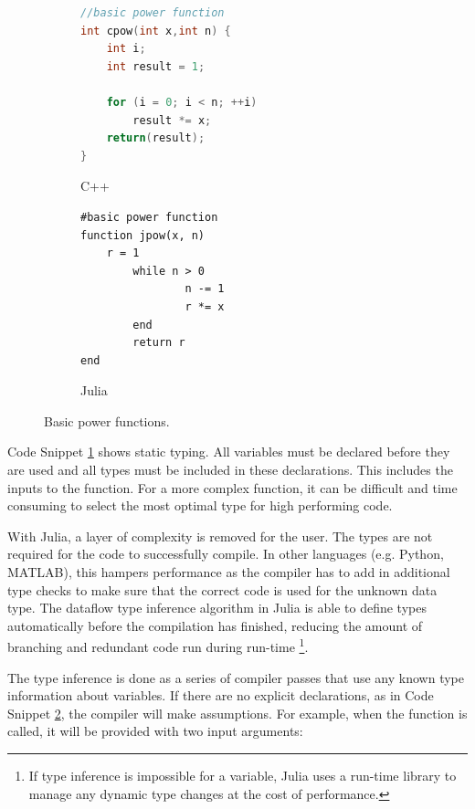 
\begin{figure}[htb!]
    \begin{subfigure}{0.48\textwidth}
\begin{lstlisting}[language=C]
//basic power function
int cpow(int x,int n) {
    int i;
    int result = 1;

    for (i = 0; i < n; ++i)
        result *= x;
    return(result);
}
\end{lstlisting}
    \caption{C++}
    \label{code:cpow}
    \end{subfigure}%
    \hfill
    \begin{subfigure}{0.48\textwidth}
\begin{lstlisting}
#basic power function
function jpow(x, n) 
    r = 1
        while n > 0
                n -= 1
                r *= x
        end
        return r
end
\end{lstlisting}
    \caption{Julia}
    \label{code:jpow}
    \end{subfigure}
    \caption{Basic power functions.}
\label{code:powfuncs}
\end{figure}

Code Snippet \ref{code:cpow} shows static typing. All variables must be declared before they are used and all types must be included in these declarations. This includes the inputs to the function. For a more complex function, it can be difficult and time consuming to select the most optimal type for high performing code.

With Julia, a layer of complexity is removed for the user. The types are not required for the code to successfully compile. In other languages (e.g. Python, MATLAB), this hampers performance as the compiler has to add in additional type checks to make sure that the correct code is used for the unknown data type. The dataflow type inference algorithm in Julia is able to define types automatically before the compilation has finished, reducing the amount of branching and redundant code run during run-time \footnote{If type inference is impossible for a variable, Julia uses a run-time library to manage any dynamic type changes at the cost of performance.}.

The type inference is done as a series of compiler passes that use any known type information about variables. If there are no explicit declarations, as in Code Snippet  \ref{code:jpow}, the compiler will make assumptions. For example, when the function is called, it will be provided with two input arguments:

